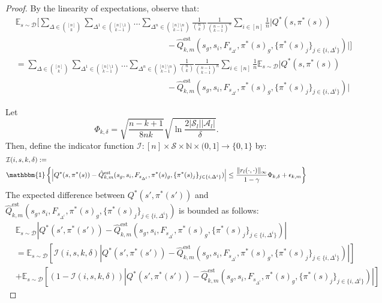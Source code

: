 \documentclass{article}
\theoremstyle{plain}
\theoremstyle{definition}
\def\est{\mathrm{est}}
\def\E{\mathbb{E}}
\begin{document}
\begin{proof}
By the linearity of expectations, observe that:
\begin{align*}
&\mathbb{E}_{s\sim \mathcal{D}}\bigg[\sum_{\Delta\in {[n]\choose k}}\sum_{\Delta^1 \in {[n]\setminus 1 \choose k-1}}\dots\sum_{\Delta^n \in {[n]\setminus n \choose k-1}}\frac{1}{{n\choose k}}\frac{1}{{n-1 \choose k-1}^n}\sum_{i\in[n]}\frac{1}{n}\bigg|Q^*(s, \pi^*(s)) \\ &\quad\quad\quad\quad\quad\quad\quad\quad\quad\quad\quad\quad\quad\quad\quad\quad\quad\quad - \hat{Q}^\est_{k,m}(s_g, s_{i},F_{s_{\Delta^i}}, \pi^*(s)_g, \{\pi^*(s)_j\}_{j\in \{i,\Delta^i\}})\bigg|\bigg]\\
& =\sum_{\Delta\in {[n]\choose k}}\sum_{\Delta^1 \in {[n]\setminus 1 \choose k-1}}\dots\sum_{\Delta^n \in {[n]\setminus n \choose k-1}}\frac{1}{{n\choose k}}\frac{1}{{n-1 \choose k-1}^n}\sum_{i\in[n]}\frac{1}{n}\mathbb{E}_{s\sim \mathcal{D}}\bigg|Q^*(s, \pi^*(s)) \\ &\quad\quad\quad\quad\quad\quad\quad\quad\quad\quad\quad\quad\quad\quad\quad\quad\quad\quad- \hat{Q}^\est_{k,m}(s_g, s_i, F_{s_{\Delta^i}}, \pi^*(s)_g, \{\pi^*(s)_j\}_{j\in\{i,\Delta^i\}})\bigg|
\end{align*}

Let \[\Phi_{k,\delta} = \sqrt{\frac{n-k+1}{8nk}}\sqrt{\ln\frac{2|\mathcal{S}_l||\mathcal{A}_l|}{\delta}}.\] Then, define the indicator function $\mathcal{I}:[n]\times\mathcal{S}\times \mathbb{N} \times (0,1] \to \{0,1\}$ by:
\begin{align*}&\mathcal{I}(i, s, k, \delta):=\\
&\mathbbm{1}\left\{\left|Q^*(s, \pi^*(s))-\hat{Q}_{k,m}^\est(s_g, s_i, F_{s_{\Delta^i}}, \pi^*(s)_g, \{\pi^*(s)_j\}_{j\in\{i,\Delta^i\}})\right|\leq\frac{\|r_l(\cdot,\cdot)\|_\infty}{1-\gamma}\Phi_{k,\delta} + \epsilon_{k,m}\right\}\end{align*}
The expected difference between $Q^*(s',\pi^*(s'))$ and $\hat{Q}_{k,m}^\est(s_g, s_i, F_{s_{\Delta^i}}, \pi^*(s)_g, \{\pi^*(s)_j\}_{j\in\{i,\Delta^i\}})$ is bounded as follows:
\begin{align*}
    &\E_{s\sim \mathcal{D}}\left|Q^*(s',\pi^*(s'))-\hat{Q}_{k,m}^\est(s_g, s_i, F_{s_{\Delta^i}}, \pi^*(s)_g, \{\pi^*(s)_j\}_{j\in\{i,\Delta^i\}})\right| \\
    & = \E_{s\sim \mathcal{D}}\left[\mathcal{I}(i, s,k,\delta)\left|Q^*(s',\pi^*(s'))-\hat{Q}_{k,m}^\est(s_g, s_i, F_{s_{\Delta^i}}, \pi^*(s)_g, \{\pi^*(s)_j\}_{j\in\{i,\Delta^i\}})\right|\right] \\
    &+ \E_{s\sim \mathcal{D}}\left[(1-\mathcal{I}(i, s,k,\delta))\left|Q^*(s',\pi^*(s'))-\hat{Q}_{k,m}^\est(s_g, s_i, F_{s_{\Delta^i}}, \pi^*(s)_g, \{\pi^*(s)_j\}_{j\in\{i,\Delta^i\}})\right|\right]
\end{align*}


\end{proof}
\end{document}
